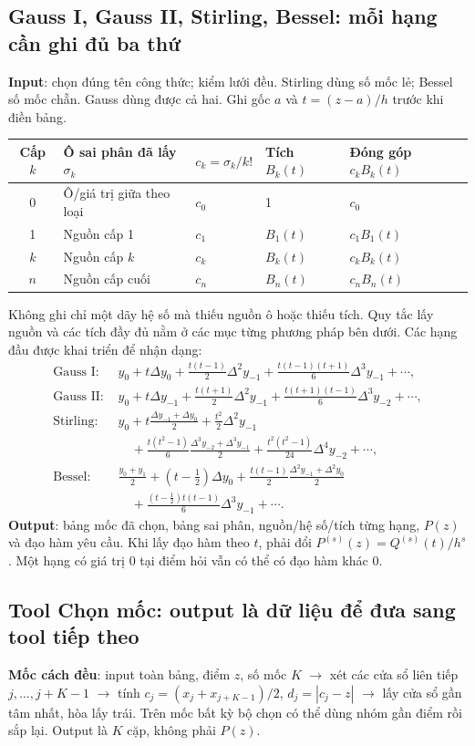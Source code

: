 \subsection{Gauss I, Gauss II, Stirling, Bessel: mỗi hạng cần ghi đủ ba thứ}
\textbf{Input}: chọn đúng tên công thức; kiểm lưới đều. Stirling dùng số mốc lẻ; Bessel số mốc chẵn. Gauss dùng được cả hai. Ghi gốc $a$ và $t=(z-a)/h$ trước khi điền bảng.
\begin{center}\small\begin{tabular}{cllll}\toprule
Cấp $k$&Ô sai phân đã lấy $\sigma_k$&$c_k=\sigma_k/k!$&Tích $B_k(t)$&Đóng góp $c_kB_k(t)$\\\midrule
0&Ô/giá trị giữa theo loại&$c_0$&1&$c_0$\\
1&Nguồn cấp 1&$c_1$&$B_1(t)$&$c_1B_1(t)$\\
$k$&Nguồn cấp $k$&$c_k$&$B_k(t)$&$c_kB_k(t)$\\
$n$&Nguồn cấp cuối&$c_n$&$B_n(t)$&$c_nB_n(t)$\\\bottomrule
\end{tabular}\end{center}
Không ghi chỉ một dãy hệ số mà thiếu nguồn ô hoặc thiếu tích. Quy tắc lấy nguồn và các tích đầy đủ nằm ở các mục từng phương pháp bên dưới. Các hạng đầu được khai triển để nhận dạng:
\begin{align*}
\text{Gauss I: }&y_0+t\Delta y_0+\tfrac{t(t-1)}2\Delta^2y_{-1}
 +\tfrac{t(t-1)(t+1)}6\Delta^3y_{-1}+\cdots,\\
\text{Gauss II: }&y_0+t\Delta y_{-1}+\tfrac{t(t+1)}2\Delta^2y_{-1}
 +\tfrac{t(t+1)(t-1)}6\Delta^3y_{-2}+\cdots,\\
\text{Stirling: }&y_0+t\tfrac{\Delta y_{-1}+\Delta y_0}2+\tfrac{t^2}2\Delta^2y_{-1}\\
 &\quad+\tfrac{t(t^2-1)}6\tfrac{\Delta^3y_{-2}+\Delta^3y_{-1}}2
 +\tfrac{t^2(t^2-1)}{24}\Delta^4y_{-2}+\cdots,\\
\text{Bessel: }&\tfrac{y_0+y_1}2+(t-\tfrac12)\Delta y_0
 +\tfrac{t(t-1)}2\tfrac{\Delta^2y_{-1}+\Delta^2y_0}2\\
 &\quad+\tfrac{(t-\tfrac12)t(t-1)}6\Delta^3y_{-1}+\cdots.
\end{align*}
\textbf{Output}: bảng mốc đã chọn, bảng sai phân, nguồn/hệ số/tích từng hạng, $P(z)$ và đạo hàm yêu cầu. Khi lấy đạo hàm theo $t$, phải đổi $P^{(s)}(z)=Q^{(s)}(t)/h^s$. Một hạng có giá trị 0 tại điểm hỏi vẫn có thể có đạo hàm khác 0.

\subsection{Tool Chọn mốc: output là dữ liệu để đưa sang tool tiếp theo}

\textbf{Mốc cách đều}: input toàn bảng, điểm $z$, số mốc $K$ $\to$ xét các cửa sổ liên tiếp $j,\ldots,j+K-1$ $\to$ tính $c_j=(x_j+x_{j+K-1})/2$, $d_j=|c_j-z|$ $\to$ lấy cửa sổ gần tâm nhất, hòa lấy trái. Trên mốc bất kỳ bộ chọn có thể dùng nhóm gần điểm rồi sắp lại. Output là $K$ cặp, không phải $P(z)$.

